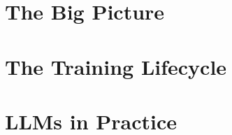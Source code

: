 \documentclass[oneside,11pt]{memoir}
\begin{document}




\part{The Big Picture}





\part{The Training Lifecycle}






\part{LLMs in Practice}











\end{document}
